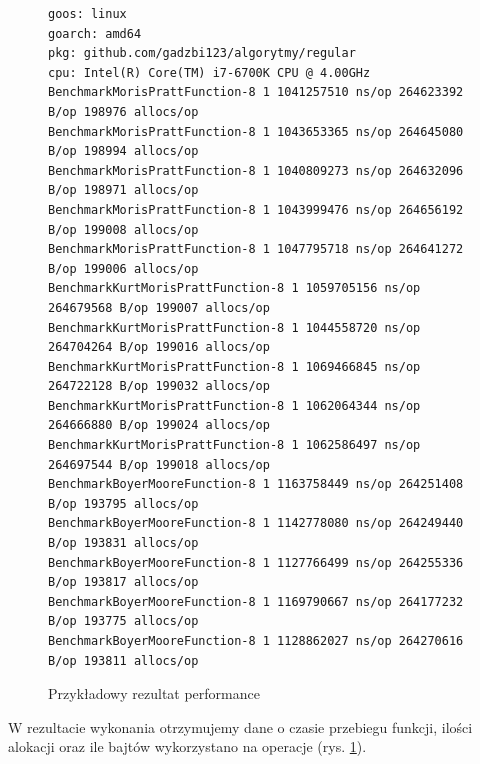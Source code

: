 \begin{figure}[h]
  \centering
  \begin{lstlisting}
goos: linux
goarch: amd64
pkg: github.com/gadzbi123/algorytmy/regular
cpu: Intel(R) Core(TM) i7-6700K CPU @ 4.00GHz
BenchmarkMorisPrattFunction-8 1	1041257510 ns/op 264623392 B/op 198976 allocs/op
BenchmarkMorisPrattFunction-8 1	1043653365 ns/op 264645080 B/op 198994 allocs/op
BenchmarkMorisPrattFunction-8 1	1040809273 ns/op 264632096 B/op 198971 allocs/op
BenchmarkMorisPrattFunction-8 1	1043999476 ns/op 264656192 B/op 199008 allocs/op
BenchmarkMorisPrattFunction-8 1	1047795718 ns/op 264641272 B/op 199006 allocs/op
BenchmarkKurtMorisPrattFunction-8 1	1059705156 ns/op 264679568 B/op 199007 allocs/op
BenchmarkKurtMorisPrattFunction-8 1	1044558720 ns/op 264704264 B/op 199016 allocs/op
BenchmarkKurtMorisPrattFunction-8 1	1069466845 ns/op 264722128 B/op 199032 allocs/op
BenchmarkKurtMorisPrattFunction-8 1	1062064344 ns/op 264666880 B/op 199024 allocs/op
BenchmarkKurtMorisPrattFunction-8 1	1062586497 ns/op 264697544 B/op 199018 allocs/op
BenchmarkBoyerMooreFunction-8 1	1163758449 ns/op 264251408 B/op 193795 allocs/op
BenchmarkBoyerMooreFunction-8 1	1142778080 ns/op 264249440 B/op 193831 allocs/op
BenchmarkBoyerMooreFunction-8 1	1127766499 ns/op 264255336 B/op 193817 allocs/op
BenchmarkBoyerMooreFunction-8 1	1169790667 ns/op 264177232 B/op 193775 allocs/op
BenchmarkBoyerMooreFunction-8 1	1128862027 ns/op 264270616 B/op 193811 allocs/op
  \end{lstlisting}
  \caption{Przykładowy rezultat performance}
  \label{fig:perfTestResults}
\end{figure}
W rezultacie wykonania otrzymujemy dane o czasie przebiegu funkcji, ilości 
alokacji oraz ile bajtów wykorzystano na operacje (rys. \ref{fig:perfTestResults}).

